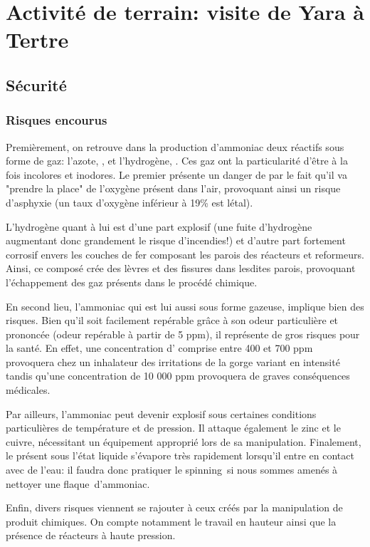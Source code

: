 \documentclass[a4paper,12pt, oneside]{article}
\begin{document}
\chapter{Activité de terrain: visite de Yara à Tertre}
\section{Sécurité}
	\subsection{Risques encourus}
		Premièrement, on retrouve dans la production d'ammoniac deux réactifs sous forme de gaz: l'azote, , et l'hydrogène, . Ces gaz ont la particularité d'être à la fois incolores et inodores. Le premier présente un danger de par le fait qu'il va "prendre la place" de l'oxygène présent dans l'air, provoquant ainsi un risque d'asphyxie (un taux d'oxygène inférieur à 19\% est létal). 
		
		L'hydrogène quant à lui est d'une part explosif (une fuite d'hydrogène augmentant donc grandement le risque d'incendies!) et d'autre part fortement corrosif envers les couches de fer composant les parois des réacteurs et reformeurs. Ainsi, ce composé crée des lèvres et des fissures dans lesdites parois, provoquant l'échappement des gaz présents dans le procédé chimique.
		
		En second lieu, l'ammoniac qui est lui aussi sous forme gazeuse, implique bien des risques. Bien qu'il soit facilement repérable grâce à son odeur particulière et prononcée (odeur repérable à partir de 5 ppm), il représente de gros risques pour la santé. En effet, une concentration d' comprise entre 400 et 700 ppm provoquera chez un inhalateur des irritations de la gorge variant en intensité tandis qu'une concentration de 10 000 ppm provoquera de graves conséquences médicales.
		
		Par ailleurs, l'ammoniac peut devenir explosif sous certaines conditions particulières de température et de pression. Il attaque également le zinc et le cuivre, nécessitant un équipement approprié lors de sa manipulation. Finalement, le  présent sous l'état liquide s'évapore très rapidement lorsqu'il entre en contact avec de l'eau: il faudra donc pratiquer le \og spinning\fg \ si nous sommes amenés à nettoyer une \og flaque\fg \ d'ammoniac.
		
		Enfin, divers risques viennent se rajouter à ceux créés par la manipulation de produit chimiques. On compte notamment le travail en hauteur ainsi que la présence de réacteurs à haute pression.
		
\end{document}
